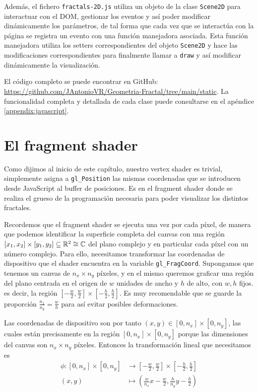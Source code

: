 Además, el fichero \verb|fractals-2D.js| utiliza un objeto de la clase \verb|Scene2D| para interactuar con el DOM, gestionar los eventos y así poder modificar dinámicamente los parámetros, de tal forma que cada vez que se interactúa con la página se registra un evento con una función manejadora asociada. Esta función manejadora utiliza los setters correspondientes del objeto \verb|Scene2D| y hace las modificaciones correspondientes para finalmente llamar a \verb|draw| y así modificar dinámicamente la visualización.

El código completo se puede encontrar en GitHub: \url{https://github.com/JAntonioVR/Geometria-Fractal/tree/main/static}. La funcionalidad completa y detallada de cada clase puede consultarse en el apéndice \ref{appendix:javascript}.

\section{El fragment shader}
\label{section:fs-2D}

Como dijimos al inicio de este capítulo, nuestro vertex shader es trivial, simplemente asigna a \verb|gl_Position| las mismas coordenadas que se introducen desde JavaScript al buffer de posiciones. Es en el fragment shader donde se realiza el grueso de la programación necesaria para poder visualizar los distintos fractales.

Recordemos que el fragment shader se ejecuta una vez por cada píxel, de manera que podemos identificar la superficie completa del canvas con una región $[x_1,x_2]\times [y_1,y_2]\subseteq\mathbb{R}^2\cong\mathbb{C}$ del plano complejo y en particular cada píxel con un número complejo. Para ello, necesitamos transformar las coordenadas de dispositivo que el shader encuentra en la variable \verb|gl_FragCoord|. Supongamos que tenemos un canvas de $n_x\times n_y$ píxeles, y en el mismo queremos graficar una región del plano centrada en el origen de $w$ unidades de ancho y $h$ de alto, con $w,h$ fijos. es decir, la región $\left[-\frac{w}{2},\frac{w}{2}\right]\times\left[-\frac{h}{2},\frac{h}{2}\right]$. Es muy recomendable que se guarde la proporción $\frac{n_x}{n_y}=\frac{w}{h}$ para así evitar posibles deformaciones.

Las coordenadas de dispositivo son por tanto $(x,y)\in[0,n_x]\times[0,n_y]$, las cuales están precisamente en la región $[0,n_x]\times[0,n_y]$ porque las dimensiones del canvas son $n_x\times n_y$ píxeles. Entonces la transformación lineal que necesitamos es 
\begin{equation}
\label{eq:transformacion-lineal-1}
\begin{split}
    \phi:[0,n_x]\times[0,n_y] & \longrightarrow \left[-\frac{w}{2},\frac{w}{2}\right]\times\left[-\frac{h}{2},\frac{h}{2}\right] \\
    (x,y) & \longmapsto \left(\frac{w}{n_x}x-\frac{w}{2},\frac{h}{n_y}y-\frac{h}{2}\right)
\end{split}
\end{equation}

